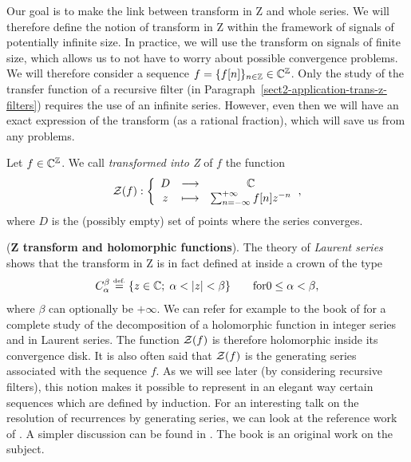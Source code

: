 Our goal is to make the link between transform in Z and whole series. We will therefore define the notion of transform in Z within the framework of signals of potentially infinite size. In practice, we will use the transform on signals of finite size, which allows us to not have to worry about possible convergence problems. We will therefore consider a sequence $ f = \{f [n] \}_{n \in \mathbb{Z}} \in \mathbb{C}^{\mathbb{Z}} $. Only the study of the transfer function of a recursive filter (in Paragraph~\ref{sect2-application-trans-z-filters}) requires the use of an infinite series. However, even then we will have an exact expression of the transform (as a rational fraction), which will save us from any problems.
 
\begin{defn}[Transform to Z]
 \label{notation-60} Let $ f \in \mathbb{C}^{\mathbb{Z}} $. We call \textit{transformed into Z} of $ f $ the function
\begin{equation}
\label{eq-trans-Z-defn}
\mathcal{Z} (f): {\left\{ \begin{array}{ccc} D & \longrightarrow & \mathbb{C} \\ z & \longmapsto & \sum_{n = -\infty}^{+\infty}{f [n] z^{- n}} \end{array} \right.},
\end{equation}
where $ D $ is the (possibly empty) set of points where the series converges.
\end{defn}
 
 
\begin{rem}{(\upshape \textbf{Z transform and holomorphic functions}).} 
    The theory of \textit{Laurent series} shows that the transform in Z is in fact defined at inside a crown of the type
\begin{equation*}
C_{\alpha}^{\beta} \eqdef \{z \in \CC; \; \alpha <| z | <\beta \} \quad \quad \text{for} 0 \leq \alpha <\beta,
\end{equation*}
where $ \beta $ can optionally be $ + \infty $. We can refer for example to the book of  \cite{cartan-holo} for a complete study of the decomposition of a holomorphic function in integer series and in Laurent series. The function $ \mathcal{Z} (f) $ is therefore holomorphic inside its convergence disk. It is also often said that $ \mathcal{Z} (f) $ is the generating series associated with the sequence $ f $. As we will see later (by considering recursive filters), this notion makes it possible to represent in an elegant way certain sequences which are defined by induction. For an interesting talk on the resolution of recurrences by generating series, we can look at the reference work of  \cite{knuth-concrete}. A simpler discussion can be found in \cite{froidevaux}. The book \cite{generatingfunctionology} is an original work on the subject.
\end{rem}
 
